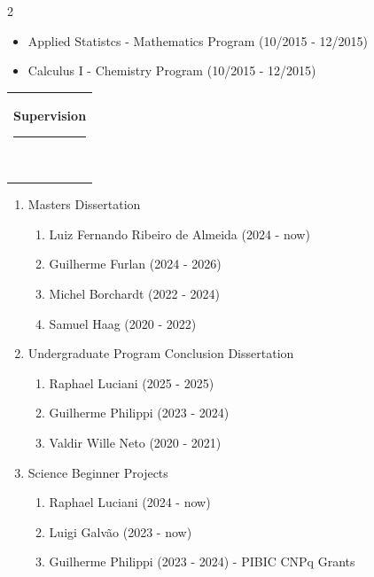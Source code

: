 \documentclass[10pt,A4,english]{article}
\newcommand{\mpwidth}{\linewidth-\fboxsep-\fboxsep}
\newcommand{\cvtext}[1] {
	\begin{tabular*}{1\mpwidth}{p{1.05\mpwidth}}
		\parbox{1\mpwidth}{#1}
	\end{tabular*}
}
\newcommand{\cvsection}[1] {
	\vspace{14pt}
	\cvtext{
		\textbf{\LARGE{\textcolor{darkcol}{#1}}}\\[-4pt]
		\textcolor{accentcol}{ \rule{0.2\textwidth}{1.5pt} } \\
	}
}
\begin{document}
\begin{paracol}{2}
\begin{rightcolumn}
\begin{enumerate}
\begin{itemize}
        \item Applied Statistcs - Mathematics Program (10/2015 - 12/2015)
        
        \item Calculus I - Chemistry Program (10/2015 - 12/2015)
    \end{itemize}
    
\end{enumerate}

\bigskip 

\cvsection{Supervision}

\begin{enumerate}

    \item Masters Dissertation
    \begin{enumerate}

        \item Luiz Fernando Ribeiro de Almeida (2024 - now)
        
		\item Guilherme Furlan (2024 - 2026)
		
        \item Michel Borchardt (2022 - 2024)
        
        \item Samuel Haag (2020 - 2022)
    \end{enumerate}
    
    \item Undergraduate Program Conclusion Dissertation
    \begin{enumerate}
		\item Raphael Luciani (2025 - 2025)

        \item Guilherme Philippi (2023 - 2024)
    
        \item Valdir Wille Neto (2020 - 2021)
    \end{enumerate}
    
    \item Science Beginner Projects 
    \begin{enumerate}

        \item Raphael Luciani (2024 - now)

        \item Luigi Galvão (2023 - now) 

        \item Guilherme Philippi (2023 - 2024) - PIBIC CNPq Grants
        

\end{enumerate}
\end{enumerate}
\end{rightcolumn}
\end{paracol}
\end{document}
